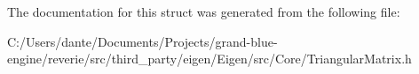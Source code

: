 The documentation for this struct was generated from the following file\+:\begin{DoxyCompactItemize}
\item 
C\+:/\+Users/dante/\+Documents/\+Projects/grand-\/blue-\/engine/reverie/src/third\+\_\+party/eigen/\+Eigen/src/\+Core/Triangular\+Matrix.\+h\end{DoxyCompactItemize}
